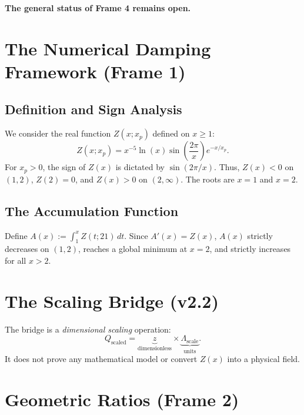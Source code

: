 \documentclass[12pt,a4paper]{article}
\begin{document}
\textbf{The general status of Frame 4 remains open.}

\section{The Numerical Damping Framework (Frame 1)}\label{sec:numerical}

\subsection{Definition and Sign Analysis}
We consider the real function $Z(x; x_p)$ defined on $x \ge 1$:
\begin{equation}\label{eq:Z}
Z(x; x_p) = x^{-5} \ln(x) \sin\left(\frac{2\pi}{x}\right) e^{-x/x_p}.
\end{equation}
For $x_p > 0$, the sign of $Z(x)$ is dictated by $\sin(2\pi/x)$. Thus, $Z(x) < 0$ on $(1, 2)$, $Z(2) = 0$, and $Z(x) > 0$ on $(2, \infty)$. The roots are $x=1$ and $x=2$.

\subsection{The Accumulation Function}
Define $A(x) := \int_1^x Z(t; 21)\, dt$. Since $A'(x) = Z(x)$, $A(x)$ strictly decreases on $(1, 2)$, reaches a global minimum at $x=2$, and strictly increases for all $x > 2$.

\section{The Scaling Bridge (v2.2)}\label{sec:bridge}

The bridge is a \emph{dimensional scaling} operation:
\begin{equation}\label{eq:bridge}
Q_{\text{scaled}} = \underbrace{z}_{\text{dimensionless}} \times \underbrace{\Lambda_{\text{scale}}}_{\text{units}}.
\end{equation}
It does not prove any mathematical model or convert $Z(x)$ into a physical field.

\section{Geometric Ratios (Frame 2)}\label{sec:geometric}
\end{document}
